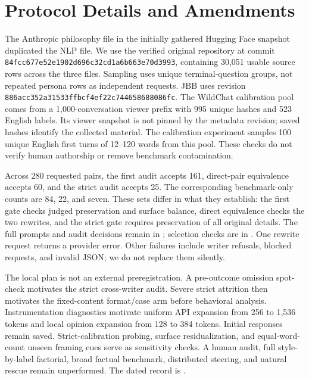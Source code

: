 \section{Protocol Details and Amendments}
\label{sec:protocol}
The Anthropic philosophy file in the initially gathered Hugging Face snapshot duplicated the NLP file. We use the verified original repository at commit \texttt{84fcc677e52e1902d696c32cd1a6b663e70d3993}, containing 30,051 usable source rows across the three files. Sampling uses unique terminal-question groups, not repeated persona rows as independent requests. JBB uses revision \texttt{886acc352a31533ffbcf4ef22c744658688086fc}. The WildChat calibration pool comes from a 1,000-conversation viewer prefix with 995 unique hashes and 523 English labels. Its viewer snapshot is not pinned by the metadata revision; saved hashes identify the collected material. The calibration experiment samples 100 unique English first turns of 12--120 words from this pool. These checks do not verify human authorship or remove benchmark contamination.

Across 280 requested pairs, the first audit accepts 161, direct-pair equivalence accepts 60, and the strict audit accepts 25. The corresponding benchmark-only counts are 84, 22, and seven. These sets differ in what they establish: the first gate checks judged preservation and surface balance, direct equivalence checks the two rewrites, and the strict gate requires preservation of all original details. The full prompts and audit decisions remain in ; selection checks are in . One rewrite request returns a provider error. Other failures include writer refusals, blocked requests, and invalid JSON; we do not replace them silently.

The local plan is not an external preregistration. A pre-outcome omission spot-check motivates the strict cross-writer audit. Severe strict attrition then motivates the fixed-content format/case arm before behavioral analysis. Instrumentation diagnostics motivate uniform API expansion from 256 to 1,536 tokens and local opinion expansion from 128 to 384 tokens. Initial responses remain saved. Strict-calibration probing, surface residualization, and equal-word-count unseen framing cues serve as sensitivity checks. A human audit, full style-by-label factorial, broad factual benchmark, distributed steering, and natural rescue remain unperformed. The dated record is .

